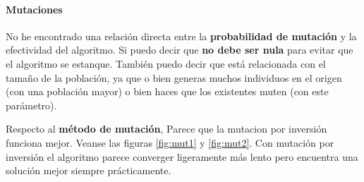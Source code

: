 \documentclass[10pt]{article}
\begin{document}
\paragraph{Mutaciones}
No he encontrado una relación directa entre la \textbf{probabilidad de mutación} y la efectividad del algoritmo. Si puedo decir que \textbf{no debe ser nula} para evitar que el algoritmo se estanque. También puedo decir que está relacionada con el tamaño de la población, ya que o bien generas muchos individuos en el origen (con una población mayor) o bien haces que los existentes muten (con este parámetro). \par
Respecto al \textbf{método de mutación}, Parece que la mutacion por inversión funciona mejor. Veanse las figuras \ref{fig:mut1} y \ref{fig:mut2}. Con mutación por inversión el algoritmo parece converger ligeramente más lento pero encuentra una solución mejor siempre prácticamente.
\end{document}
